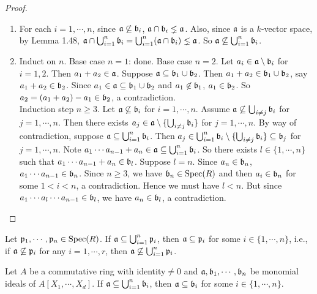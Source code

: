 \begin{proof}
    \begin{enumerate}
        \item For each $i = 1,\cdots,n$, since $\mathfrak{a} \not \subseteq \mathfrak{b}_i$, $\mathfrak{a} \cap \mathfrak{b}_i \lneq \mathfrak{a}$. Also, since $\mathfrak{a}$ is a $k$-vector space, by Lemma 1.48, $\mathfrak{a} \cap \bigcup_{i=1}^n \mathfrak{b}_i = \bigcup_{i=1}^n (\mathfrak{a} \cap \mathfrak{b}_i) \lneq \mathfrak{a}$. So $\mathfrak{a} \not \subseteq \bigcup_{i=1}^n \mathfrak{b}_i$. 
        \item Induct on $n$. Base case $n = 1$: done. Base case $n = 2$. Let $a_i \in \mathfrak{a} \setminus \mathfrak{b}_i$ for $i = 1,2$. Then $a_1 + a_2 \in \mathfrak{a}$. Suppose $\mathfrak{a} \subseteq \mathfrak{b}_1 \cup \mathfrak{b}_2$. Then $a_1 + a_2 \in \mathfrak{b}_1 \cup \mathfrak{b}_2$, say $a_1 + a_2 \in \mathfrak{b}_2$. Since $a_1 \in \mathfrak{a} \subseteq \mathfrak{b}_1 \cup \mathfrak{b}_2$ and $a_1 \not \in \mathfrak{b}_1$, $a_1 \in \mathfrak{b}_2$. So $a_2 = (a_1 + a_2) - a_1 \in \mathfrak{b}_2$, a contradiction. \\
            Induction step $n \geq 3$. Let $\mathfrak{a} \not \subseteq \mathfrak{b}_i$ for $i = 1,\cdots,n$. Assume $\mathfrak{a} \not \subseteq \bigcup_{i \neq j} \mathfrak{b}_i$ for $j = 1,\cdots,n$. Then there exists $a_j \in \mathfrak{a} \setminus \{\bigcup_{i \neq j} \mathfrak{b}_i\}$ for $j = 1,\cdots,n$. By way of contradiction, suppose $\mathfrak{a} \subseteq \bigcup_{i=1}^n \mathfrak{b}_i$. Then $a_j \in \bigcup_{i=1}^n \mathfrak{b}_i \setminus \{\bigcup_{i \neq j}\mathfrak{b}_i\} \subseteq \mathfrak{b}_j$ for $j = 1,\cdots,n$. Note $a_1 \cdots a_{n-1} + a_n \in \mathfrak{a} \subseteq \bigcup_{i=1}^n \mathfrak{b}_i$. So there exists $l \in \{1,\cdots,n\}$ such that $a_1 \cdots a_{n-1} + a_n \in \mathfrak{b}_l$. Suppose $l=n$. Since $a_n \in \mathfrak{b}_n$, $a_1 \cdots a_{n-1} \in \mathfrak{b}_n$. Since $n \geq 3$, we have $\mathfrak{b}_n \in \operatorname{Spec}(R)$ and then $a_i \in \mathfrak{b}_n$ for some $1 < i < n$, a contradiction. Hence we must have $l < n$. But since $a_1 \cdots a_l \cdots a_{n-1} \in \mathfrak{b}_l$, we have $a_n \in \mathfrak{b}_l$, a contradiction. \qedhere
    \end{enumerate}
\end{proof}

\begin{theorem}
    Let $\mathfrak{p}_1,\cdots,\mathfrak{p}_n \in \operatorname{Spec}(R)$. If $\mathfrak{a} \subseteq \bigcup_{i=1}^n \mathfrak{p}_i$, then $\mathfrak{a} \subseteq \mathfrak{p}_i$ for some $i \in \{1,\cdots,n\}$, i.e., if $\mathfrak{a} \not \subseteq \mathfrak{p}_i$ for any $i = 1,\cdots,r$, then $\mathfrak{a} \not \subseteq \bigcup_{i=1}^n \mathfrak{p}_i$.
\end{theorem}

\begin{fact*} 
    Let $A$ be a commutative ring with identity$\neq 0$ and $\mathfrak{a},\mathfrak{b}_1,\cdots,\mathfrak{b}_n$ be monomial ideals of $A[X_1,\cdots,X_d]$. If $\mathfrak{a} \subseteq \bigcup_{i=1}^n \mathfrak{b}_i$, then $\mathfrak{a} \subseteq \mathfrak{b}_i$ for some $i \in \{1,\cdots,n\}$.
\end{fact*}

